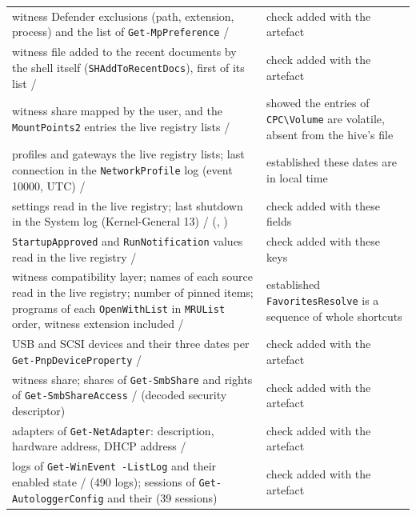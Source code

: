 \documentclass[11pt,a4paper,oneside]{report}
\begin{document}
\begin{longtable}{@{}L{6.6cm}L{8.4cm}@{}}
witness Defender exclusions (path, extension, process) and the list of
  \texttt{Get-MpPreference} /  &
  check added with the artefact \\
witness file added to the recent documents by the shell itself
  (\texttt{SHAddToRecentDocs}), first of its list /  &
  check added with the artefact \\
witness share mapped by the user, and the \texttt{MountPoints2} entries the
  live registry lists /  &
  showed the entries of \texttt{CPC\textbackslash Volume} are volatile, absent
  from the hive's file \\
profiles and gateways the live registry lists; last connection in the
  \texttt{NetworkProfile} log (event 10000, UTC) /
   &
  established these dates are in local time \\
settings read in the live registry; last shutdown in the System log
  (Kernel-General 13) /  (,
  ) &
  check added with these fields \\
\texttt{StartupApproved} and \texttt{RunNotification} values read in the live
  registry /  &
  check added with these keys \\
witness compatibility layer; names of each source read in the live registry;
  number of pinned items; programs of each \texttt{OpenWithList} in
  \texttt{MRUList} order, witness extension included /
   &
  established \texttt{FavoritesResolve} is a sequence of whole shortcuts \\
USB and SCSI devices and their three dates per
  \texttt{Get-PnpDeviceProperty} /  &
  check added with the artefact \\
witness share; shares of \texttt{Get-SmbShare} and rights of
  \texttt{Get-SmbShareAccess} /  (decoded
  security descriptor) &
  check added with the artefact \\
adapters of \texttt{Get-NetAdapter}: description, hardware address, DHCP
  address /  &
  check added with the artefact \\
logs of \texttt{Get-WinEvent -ListLog} and their enabled state /
   (490 logs); sessions of
  \texttt{Get-AutologgerConfig} and their  (39 sessions) &
  check added with the artefact \\

\end{longtable}
\end{document}
